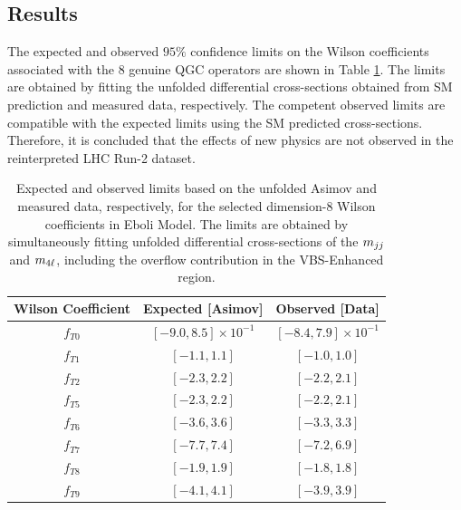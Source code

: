 \subsection{Results}
\label{subsec:EFT_Results}
The expected and observed $95\%$ confidence limits on the Wilson coefficients associated with the $8$ genuine QGC operators are shown in Table \ref{tab:twoobsofeboli}. The limits are obtained by fitting the unfolded differential cross-sections obtained from SM prediction and measured data, respectively. The competent observed limits are compatible with the expected limits using the SM predicted cross-sections. Therefore, it is concluded that the effects of new physics are not observed in the reinterpreted LHC Run-2 dataset.

\begin{table}[ht]
    \centering
    \caption{Expected and observed limits based on the unfolded Asimov and measured data, respectively, for the selected dimension-8 Wilson coefficients in Eboli Model. The limits are obtained by simultaneously fitting unfolded differential cross-sections of the $m_{jj}$ and $m_{4\ell}$, including the overflow contribution in the VBS-Enhanced region. \label{tab:twoobsofeboli}}
    \begin{tabular}{| c | c | c |}
        \hline
        Wilson Coefficient &    Expected [Asimov]  & Observed [Data]         \\
        \hline\hline
        $f_{T0}$ &  $[-9.0, 8.5]\times 10^{-1}$  & $[-8.4, 7.9] \times 10^{-1}$ \\
        $f_{T1}$ &  $[-1.1, 1.1]$ & $[-1.0, 1.0]$ \\
        $f_{T2}$ &  $[-2.3, 2.2]$ & $[-2.2, 2.1]$ \\
        $f_{T5}$ &  $[-2.3, 2.2]$ & $[-2.2, 2.1]$ \\
        $f_{T6}$ &  $[-3.6, 3.6]$ & $[-3.3, 3.3]$ \\
        $f_{T7}$ &  $[-7.7, 7.4]$ & $[-7.2, 6.9]$ \\
        $f_{T8}$ &  $[-1.9, 1.9]$ & $[-1.8, 1.8]$ \\
        $f_{T9}$ &  $[-4.1, 4.1]$ & $[-3.9, 3.9] $\\                               
        \hline
    \end{tabular}
\end{table}